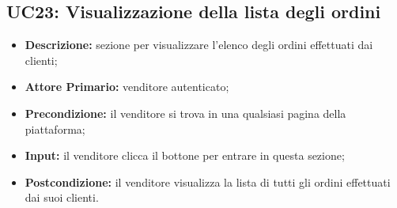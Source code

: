 \subsection{UC23: Visualizzazione della lista degli ordini}
\label{sec:UC23}
\begin{itemize}
    \item \textbf{Descrizione:} sezione per visualizzare l'elenco degli ordini effettuati dai clienti;
    \item \textbf{Attore Primario:} venditore autenticato;
    \item \textbf{Precondizione:} il venditore si trova in una qualsiasi pagina della piattaforma;
    \item \textbf{Input:} il venditore clicca il bottone per entrare in questa sezione;
    \item \textbf{Postcondizione:} il venditore visualizza la lista di tutti gli ordini effettuati dai suoi clienti.
\end{itemize}
